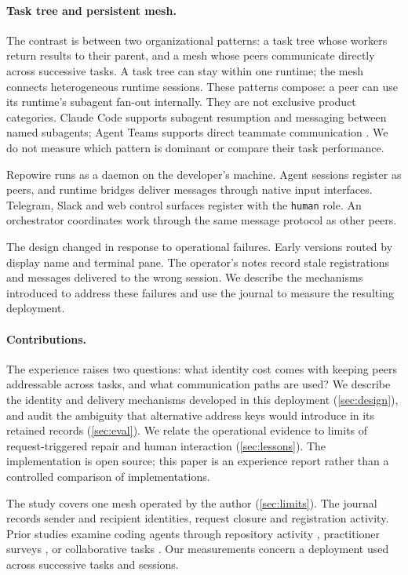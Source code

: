 \documentclass[10pt,twocolumn]{article}
\newcommand{\sys}{Repowire}
\newcommand{\code}[1]{\texttt{#1}}
\begin{document}
\paragraph{Task tree and persistent mesh.}
The contrast is between two organizational patterns: a task tree whose workers return results to their parent, and a mesh whose peers communicate directly across successive tasks. A task tree can stay within one runtime; the mesh connects heterogeneous runtime sessions. These patterns compose: a peer can use its runtime's subagent fan-out internally. They are not exclusive product categories. Claude Code supports subagent resumption and messaging between named subagents; Agent Teams supports direct teammate communication \citep{subagents2026,agentteams2026}. We do not measure which pattern is dominant or compare their task performance.

\sys{} runs as a daemon on the developer's machine. Agent sessions register as peers, and runtime bridges deliver messages through native input interfaces. Telegram, Slack and web control surfaces register with the \code{human} role. An orchestrator coordinates work through the same message protocol as other peers.

The design changed in response to operational failures. Early versions routed by display name and terminal pane. The operator's notes record stale registrations and messages delivered to the wrong session. We describe the mechanisms introduced to address these failures and use the journal to measure the resulting deployment.

\paragraph{Contributions.}
The experience raises two questions: what identity cost comes with keeping peers addressable across tasks, and what communication paths are used? We describe the identity and delivery mechanisms developed in this deployment (\cref{sec:design}), and audit the ambiguity that alternative address keys would introduce in its retained records (\cref{sec:eval}). We relate the operational evidence to limits of request-triggered repair and human interaction (\cref{sec:lessons}). The implementation is open source; this paper is an experience report rather than a controlled comparison of implementations.

The study covers one mesh operated by the author (\cref{sec:limits}). The journal records sender and recipient identities, request closure and registration activity. Prior studies examine coding agents through repository activity \citep{agarwal2026velocity,mazloomzadeh2026prs}, practitioner surveys \citep{pan2026measuring}, or collaborative tasks \citep{khatua2026cooperbench}. Our measurements concern a deployment used across successive tasks and sessions.
\end{document}
